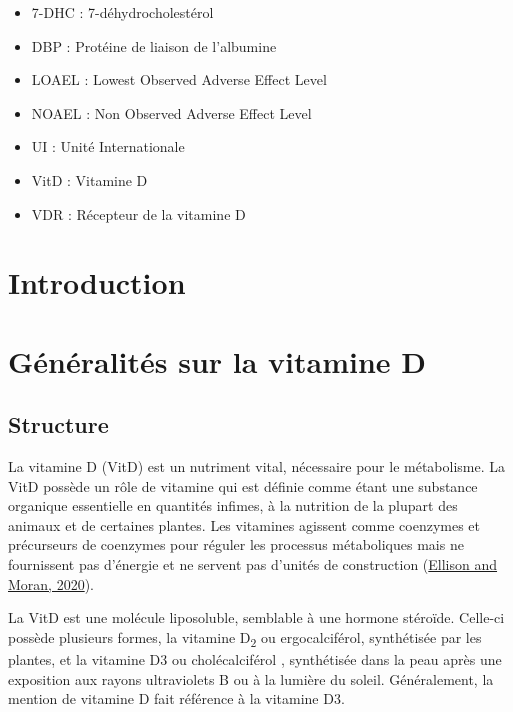 \documentclass[
  letterpaper,
  DIV=11,
  numbers=noendperiod]{scrartcl}
\providecommand{\tightlist}{%
  \setlength{\itemsep}{0pt}\setlength{\parskip}{0pt}}\usepackage{longtable,booktabs,array}
\begin{document}
\begin{itemize}
\tightlist
\item
  7-DHC : 7-déhydrocholestérol
\item
  DBP : Protéine de liaison de l'albumine
\item
  LOAEL : Lowest Observed Adverse Effect Level
\item
  NOAEL : Non Observed Adverse Effect Level
\item
  UI : Unité Internationale
\item
  VitD : Vitamine D
\item
  VDR : Récepteur de la vitamine D
\end{itemize}

\newpage{}

\hypertarget{introduction}{%
\section{Introduction}\label{introduction}}


\newpage{}

\hypertarget{guxe9nuxe9ralituxe9s-sur-la-vitamine-d}{%
\section{Généralités sur la vitamine
D}\label{guxe9nuxe9ralituxe9s-sur-la-vitamine-d}}

\hypertarget{structure}{%
\subsection{Structure}\label{structure}}

La vitamine D (VitD) est un nutriment vital, nécessaire pour le
métabolisme. La VitD possède un rôle de vitamine qui est définie comme
étant une substance organique essentielle en quantités infimes, à la
nutrition de la plupart des animaux et de certaines plantes. Les
vitamines agissent comme coenzymes et précurseurs de coenzymes pour
réguler les processus métaboliques mais ne fournissent pas d'énergie et
ne servent pas d'unités de construction
(\protect\hyperlink{ref-Ellison.2020}{Ellison and Moran, 2020}).

La VitD est une molécule liposoluble, semblable à une hormone stéroïde.
Celle-ci possède plusieurs formes, la vitamine D\textsubscript{2} ou
ergocalciférol, synthétisée par les plantes, et la vitamine D3 ou
cholécalciférol , synthétisée dans la peau après une exposition aux
rayons ultraviolets B ou à la lumière du soleil. Généralement, la
mention de vitamine D fait référence à la vitamine D3.
\end{document}
